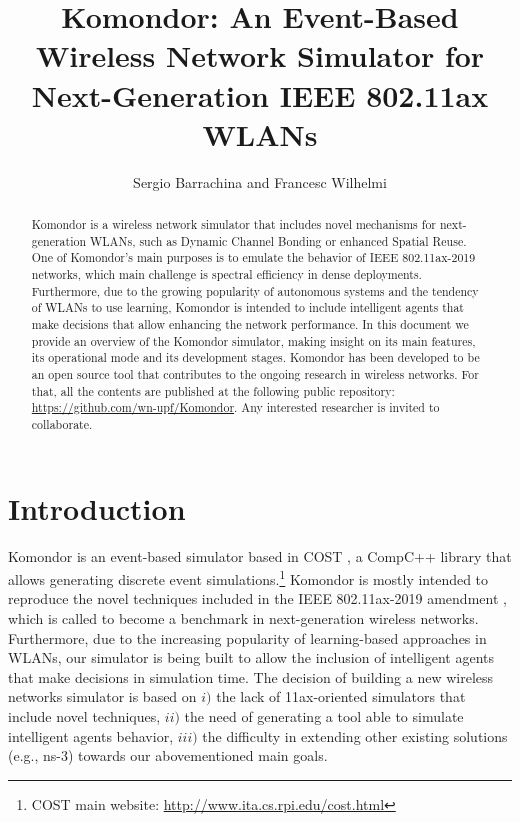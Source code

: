 \documentclass[a4paper]{article}
\title{Komondor: An Event-Based Wireless Network Simulator for Next-Generation IEEE 802.11ax WLANs}
\author{Sergio Barrachina and Francesc Wilhelmi}
\begin{document}
\maketitle

\begin{abstract}
Komondor is a wireless network simulator that includes novel mechanisms for next-generation WLANs, such as Dynamic Channel Bonding or enhanced Spatial Reuse. One of Komondor's main purposes is to emulate the behavior of IEEE 802.11ax-2019 networks, which main challenge is spectral efficiency in dense deployments. Furthermore, due to the growing popularity of autonomous systems and the tendency of WLANs to use learning, Komondor is intended to include intelligent agents that make decisions that allow enhancing the network performance. In this document we provide an overview of the Komondor simulator, making insight on its main features, its operational mode and its development stages. Komondor has been developed to be an open source tool that contributes to the ongoing research in wireless networks. For that, all the contents are published at the following public repository: \url{https://github.com/wn-upf/Komondor}. Any interested researcher is invited to collaborate.
\end{abstract}

\tableofcontents

\listoffigures

\listoftables

\section{Introduction}
\label{section:introduction}
	Komondor \cite{barrachina2017komondor} is an event-based simulator based in COST \cite{chen2002reusing}, a CompC++ library that allows generating discrete event simulations.\footnote{COST main website: \url{http://www.ita.cs.rpi.edu/cost.html}} Komondor is mostly intended to reproduce the novel techniques included in the IEEE 802.11ax-2019 amendment \cite{tgax2017draft}, which is called to become a benchmark in next-generation wireless networks. Furthermore, due to the increasing popularity of learning-based approaches in WLANs, our simulator is being built to allow the inclusion of intelligent agents that make decisions in simulation time. The decision of building a new wireless networks simulator is based on $i)$ the lack of 11ax-oriented simulators that include novel techniques, $ii)$ the need of generating a tool able to simulate intelligent agents behavior, $iii)$ the difficulty in extending other existing solutions (e.g., ns-3) towards our abovementioned main goals. 
	
\end{document}
